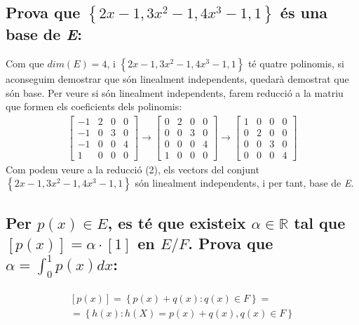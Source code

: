 \documentclass[a4paper, 11pt]{article}
\begin{document}
        \subsection{Prova que ${\left\{2x-1, 3x^2-1, 4x^3-1, 1\right\}}$ \'es una base de \emph{E}:}
            Com que ${dim(E) = 4}$, i ${\left\{2x-1, 3x^2-1, 4x^3-1, 1\right\}}$ t\'e quatre polinomis, si aconseguim demostrar que s\'on linealment independents, quedar\`a demostrat que s\'on base. Per veure si s\'on linealment independents, farem reducci\'o a la matriu que formen els coeficients dels polinomis:
            \begin{align}
                \begin{bmatrix}
                    -1 & 2 & 0 & 0\\
                    -1 & 0 & 3 & 0\\
                    -1 & 0 & 0 & 4\\
                    1 & 0 & 0 & 0
                \end{bmatrix}
                \longrightarrow
                \begin{bmatrix}
                    0 & 2 & 0 & 0\\
                    0 & 0 & 3 & 0\\
                    0 & 0 & 0 & 4\\
                    1 & 0 & 0 & 0
                \end{bmatrix}
                \longrightarrow
                \begin{bmatrix}
                    1 & 0 & 0 & 0\\
                    0 & 2 & 0 & 0\\
                    0 & 0 & 3 & 0\\
                    0 & 0 & 0 & 4
                \end{bmatrix}
            \end{align}
            Com podem veure a la reducci\'o (2), els vectors del conjunt ${\left\{2x-1, 3x^2-1, 4x^3-1, 1\right\}}$ s\'on linealment independents, i per tant, base de \emph{E}.

        \subsection{Per ${p(x) \in E}$, es t\'e que existeix ${\alpha \in \mathbb{R}}$ tal que ${\left[p(x)\right] = \alpha \cdot \left[1\right]}$ en ${E/F}$. Prova que ${\alpha = \int_0^1p(x)dx}$:}
            \begin{align*}
                \begin{aligned}
                    \left[p(x)\right] = \left\{ p(x)+q(x): q(x)\in F \right\} =\\
                    = \left\{h(x): h(X) = p(x)+q(x), q(x)\in F\right\}
                \end{aligned}
            \end{align*}
\end{document}
